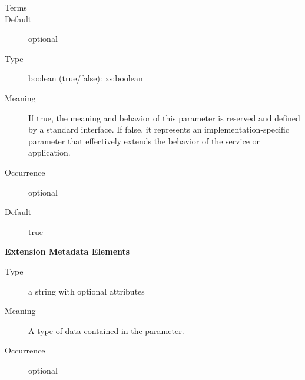 \documentclass[11pt,a4paper]{ivoa}
\begin{document}
\begin{generated}
\begin{bigdescription}
\begin{description}
\item[Terms]\hfil
{}
\item[Default] optional
\end{description}
\item[std]
\begin{description}
\item[Type] boolean (true/false): xs:boolean
\item[Meaning] If true, the meaning and behavior of this parameter is
                     reserved and defined by a standard interface.  If
                     false, it represents an implementation-specific
                     parameter that effectively extends the behavior of the
                     service or application.
\item[Occurrence] optional
\item[Default] true
\end{description}


\end{bigdescription}\endgroup



\vspace{0.5ex}\noindent\textbf{ Extension Metadata Elements}

\begingroup\small\begin{bigdescription}\item[Element \xmlel{dataType}]
\begin{description}
\item[Type] a string with optional attributes
\item[Meaning] A type of data contained in the parameter.
\item[Occurrence] optional

\end{description}


\end{bigdescription}\endgroup

\endgroup
\end{generated}
\end{document}
